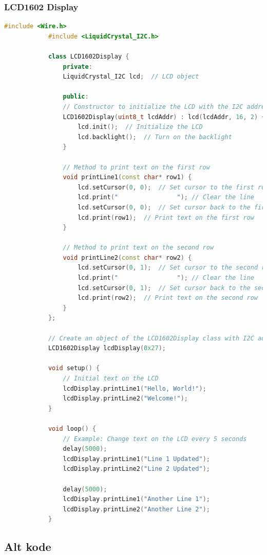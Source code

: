\documentclass[12pt,a4paper]{book}
\begin{document}
		\subsubsection*{LCD1602 Display}
		\begin{lstlisting}[language=C++]
			#include <Wire.h>
			#include <LiquidCrystal_I2C.h>
			
			class LCD1602Display {
				private:
				LiquidCrystal_I2C lcd;  // LCD object
				
				public:
				// Constructor to initialize the LCD with the I2C address
				LCD1602Display(uint8_t lcdAddr) : lcd(lcdAddr, 16, 2) {
					lcd.init();  // Initialize the LCD
					lcd.backlight();  // Turn on the backlight
				}
				
				// Method to print text on the first row
				void printLine1(const char* row1) {
					lcd.setCursor(0, 0);  // Set cursor to the first row, first column
					lcd.print("                "); // Clear the line
					lcd.setCursor(0, 0);  // Set cursor back to the first row
					lcd.print(row1);  // Print text on the first row
				}
				
				// Method to print text on the second row
				void printLine2(const char* row2) {
					lcd.setCursor(0, 1);  // Set cursor to the second row, first column
					lcd.print("                "); // Clear the line
					lcd.setCursor(0, 1);  // Set cursor back to the second row
					lcd.print(row2);  // Print text on the second row
				}
			};
			
			// Create an object of the LCD1602Display class with I2C address 0x27
			LCD1602Display lcdDisplay(0x27);
			
			void setup() {
				// Initial text on the LCD
				lcdDisplay.printLine1("Hello, World!");
				lcdDisplay.printLine2("Welcome!");
			}
			
			void loop() {
				// Example: Change text on the LCD every 5 seconds
				delay(5000);
				lcdDisplay.printLine1("Line 1 Updated");
				lcdDisplay.printLine2("Line 2 Updated");
				
				delay(5000);
				lcdDisplay.printLine1("Another Line 1");
				lcdDisplay.printLine2("Another Line 2");
			}
		\end{lstlisting}
		
		\subsection*{Alt kode}
		\begin{lstlisting}
			
		\end{lstlisting}
		
	
\end{document}
